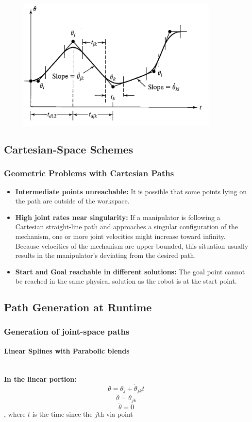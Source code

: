 \documentclass[10pt,a4paper]{article}
\begin{document}
\begin{figure}[H]
	\includegraphics[width=0.5\columnwidth]{imgs/trajectory_via.png}
\end{figure}

\subsection{Cartesian-Space Schemes}
\subsubsection{Geometric Problems with Cartesian Paths}
\begin{itemize}
	\item \textbf{Intermediate points unreachable:} It is possible that some points lying on the path are outside of the workspace.
	\item \textbf{High joint rates near singularity:} If a manipulator is following a Cartesian straight-line path and approaches a singular configuration of the mechanism, one or more joint velocities might increase toward infinity. Because velocities of the mechanism are upper bounded, this situation usually results in the manipulator's deviating from the desired path.
	\item \textbf{Start and Goal reachable in different solutions:} The goal point cannot be reached in the same physical solution as the robot is at the start point.
\end{itemize}

\subsection{Path Generation at Runtime}
\subsubsection{Generation of joint-space paths}
\paragraph{Linear Splines with Parabolic blends} ~\\
\textbf{In the linear portion:} \\
$$
	\theta = \theta_j + \dot{\theta}_{jk}t
$$
$$
	\dot{\theta} = \dot{\theta}_{jk}
$$
$$
	\ddot{\theta} = 0
$$
, where $t$ is the time since the $j$th via point
\end{document}
